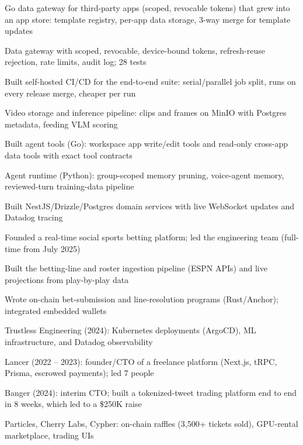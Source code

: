 \documentclass[print]{jack-resume}
\begin{document}
\begin{tightemize}
    \item Go data gateway for third-party apps (scoped, revocable tokens) that grew into an app store: template registry, per-app data storage, 3-way merge for template updates
    \item Data gateway with scoped, revocable, device-bound tokens, refresh-reuse rejection, rate limits, audit log; 28 tests
    \item Built self-hosted CI/CD for the end-to-end suite: serial/parallel job split, runs on every release merge, cheaper per run
    \item Video storage and inference pipeline: clips and frames on MinIO with Postgres metadata, feeding VLM scoring
    \item Built agent tools (Go): workspace app write/edit tools and read-only cross-app data tools with exact tool contracts
    \item Agent runtime (Python): group-scoped memory pruning, voice-agent memory, reviewed-turn training-data pipeline
\end{tightemize}
\sectionsep

\begin{tightemize}
    \item Built NestJS/Drizzle/Postgres domain services with live WebSocket updates and Datadog tracing
    \item Founded a real-time social sports betting platform; led the engineering team (full-time from July 2025)
    \item Built the betting-line and roster ingestion pipeline (ESPN APIs) and live projections from play-by-play data
    \item Wrote on-chain bet-submission and line-resolution programs (Rust/Anchor); integrated embedded wallets
\end{tightemize}
\sectionsep

\begin{tightemize}
    \item Trustless Engineering (2024): Kubernetes deployments (ArgoCD), ML infrastructure, and Datadog observability
    \item Lancer (2022 – 2023): founder/CTO of a freelance platform (Next.js, tRPC, Prisma, escrowed payments); led 7 people
    \item Banger (2024): interim CTO; built a tokenized-tweet trading platform end to end in 8 weeks, which led to a \$250K raise
    \item Particles, Cherry Labs, Cypher: on-chain raffles (3,500+ tickets sold), GPU-rental marketplace, trading UIs
\end{tightemize}
\sectionsep
\end{document}

